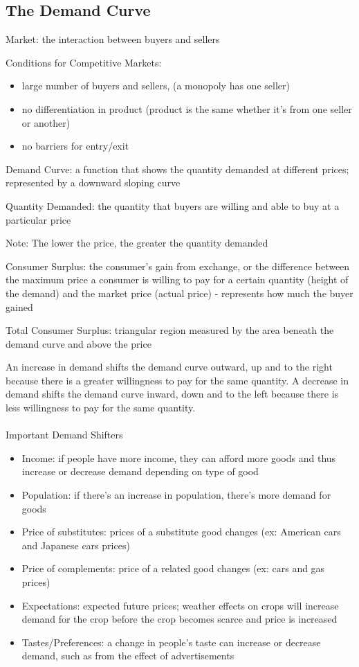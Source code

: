 \documentclass[12pt]{article}
\begin{document}
\subsection{The Demand Curve} 
\begin{definition} Market: the interaction between buyers and sellers \end{definition}
Conditions for Competitive Markets: \begin{itemize} 
\item large number of buyers and sellers, (a monopoly has one seller) 
\item no differentiation in product (product is the same whether it's from one seller or another)
\item no barriers for entry/exit
\end{itemize} 
\begin{definition} Demand Curve: a function that shows the quantity demanded at different prices; represented by a downward sloping curve \end{definition}
\begin{definition} Quantity Demanded: the quantity that buyers are willing and able to buy at a particular price \end{definition}
Note: The lower the price, the greater the quantity demanded
\begin{definition} Consumer Surplus: the consumer's gain from exchange, or the difference between the maximum price a consumer is willing to pay for a certain quantity (height of the demand) and the market price (actual price) - represents how much the buyer gained \end{definition}
\begin{definition} Total Consumer Surplus: triangular region measured by the area beneath the demand curve and above the price \end{definition}
An increase in demand shifts the demand curve outward, up and to the right because there is a greater willingness to pay for the same quantity. A decrease in demand shifts the demand curve inward, down and to the left because there is less willingness to pay for the same quantity. \\~\\
Important Demand Shifters \begin{itemize} 
\item Income: if people have more income, they can afford more goods and thus increase or decrease demand depending on type of good 
\item Population: if there's an increase in population, there's more demand for goods
\item Price of substitutes: prices of a substitute good changes (ex: American cars and Japanese cars prices)
\item Price of complements: price of a related good changes (ex: cars and gas prices)
\item Expectations: expected future prices; weather effects on crops will increase demand for the crop before the crop becomes scarce and price is increased 
\item Tastes/Preferences: a change in people's taste can increase or decrease demand, such as from the effect of advertisements 
\end{itemize} 
\end{document}
